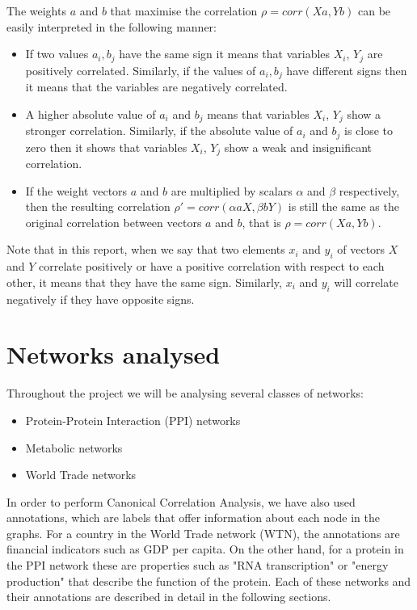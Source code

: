 The weights $a$ and $b$ that maximise the correlation $ \rho = corr(Xa, Yb) $ can be easily interpreted in the following manner:
\begin{itemize}
 \item If two values $a_i, b_j$ have the same sign it means that variables $X_i$, $Y_j$ are positively correlated. Similarly, if the values of $a_i, b_j$ have different signs then it means that the variables are negatively correlated. 
 \item A higher absolute value of $a_i$ and $b_j$ means that variables $X_i$, $Y_j$ show a stronger correlation. Similarly, if the absolute value of $a_i$ and $b_j$ is close to zero then it shows that variables $X_i$, $Y_j$ show a weak and insignificant correlation.
 \item If the weight vectors $a$ and $b$ are multiplied by scalars $\alpha$ and $\beta$ respectively, then the resulting correlation $ \rho' = corr(\alpha aX, \beta bY) $ is still the same as the original correlation between vectors $a$ and $b$, that is $ \rho = corr(Xa, Yb) $.
\end{itemize}

Note that in this report, when we say that two elements $x_i$ and $y_i$ of vectors $X$ and $Y$ correlate positively or have a positive correlation with respect to each other, it means that they have the same sign. Similarly, $x_i$ and $y_i$ will correlate negatively if they have opposite signs.

\section{Networks analysed}
\label{sec:networks_analysed}

Throughout the project we will be analysing several classes of networks:
\begin{itemize}
 \item Protein-Protein Interaction (PPI) networks
 \item Metabolic networks
 \item World Trade networks
\end{itemize}

 In order to perform Canonical Correlation Analysis, we have also used annotations, which are labels that offer information about each node in the graphs. For a country in the World Trade network (WTN), the annotations are financial indicators such as GDP per capita. On the other hand, for a protein in the PPI network these are properties such as "RNA transcription" or "energy production" that describe the function of the protein. Each of these networks and their annotations are described in detail in the following sections.

